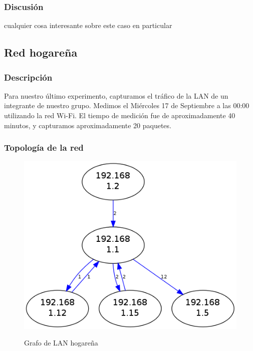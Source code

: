 \documentclass[10pt, a4paper]{article}
\begin{document}
\subsubsection{Discusión}

cualquier cosa interesante sobre este caso en particular

\subsection{Red hogareña}

\subsubsection{Descripción}
Para nuestro último experimento, capturamos el tráfico de la LAN de un integrante de nuestro grupo. Medimos el Miércoles 17 de Septiembre a las 00:00 utilizando la red Wi-Fi. El tiempo de medición fue de aproximadamente 40 minutos, y capturamos aproximadamente 20 paquetes.

\subsubsection{Topología de la red}

\begin{figure}[H]
  \begin{center}
    \includegraphics[width=\linewidth/2]{../imgs/pruebaFede-ips_red.png}
    \label{fig:FedeGrafo}
    \caption{Grafo de LAN hogareña}
  \end{center}
\end{figure}
\end{document}
